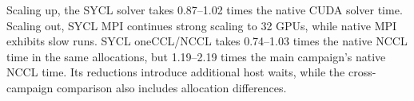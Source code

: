 \begin{keypoint}
Scaling up, the SYCL solver takes 0.87--1.02 times the native CUDA solver time. Scaling out, SYCL MPI continues strong scaling to 32 GPUs, while native MPI exhibits slow runs. SYCL oneCCL/NCCL takes 0.74--1.03 times the native NCCL time in the same allocations, but 1.19--2.19 times the main campaign's native NCCL time. Its reductions introduce additional host waits, while the cross-campaign comparison also includes allocation differences.
\end{keypoint}
